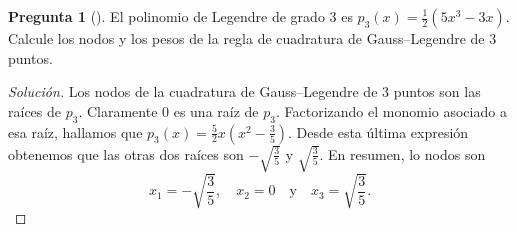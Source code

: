 \documentclass[letter,12pt]{article}
\theoremstyle{definition}
\newtheorem{question}{Pregunta}
\numberwithin{equation}{question}
\newenvironment{solution}{\begin{proof}[Solución]}{\end{proof}}
\begin{document}
\newpage
\begin{question}[] El polinomio de Legendre de grado $3$ es $p_3(x) = \frac{1}{2}(5 x^3 - 3 x)$.
Calcule los nodos y los pesos de la regla de cuadratura de Gauss--Legendre de $3$ puntos.

\begin{solution}  Los nodos de la cuadratura de Gauss--Legendre de $3$ puntos son las raíces de $p_3$.
Claramente $0$ es una raíz de $p_3$.
Factorizando el monomio asociado a esa raíz, hallamos que $p_3(x) = \frac{5}{2} x \left(x^2 - \frac{3}{5}\right)$.
Desde esta última expresión obtenemos que las otras dos raíces son $-\sqrt{\frac{3}{5}}$ y $\sqrt{\frac{3}{5}}$.
En resumen, lo nodos son
%
\begin{equation*}
x_1 = -\sqrt{\frac{3}{5}}, \quad x_2 = 0 \quad\text{y}\quad x_3 = \sqrt{\frac{3}{5}}.
\end{equation*}
%


\end{solution}
\end{question}
\end{document}
